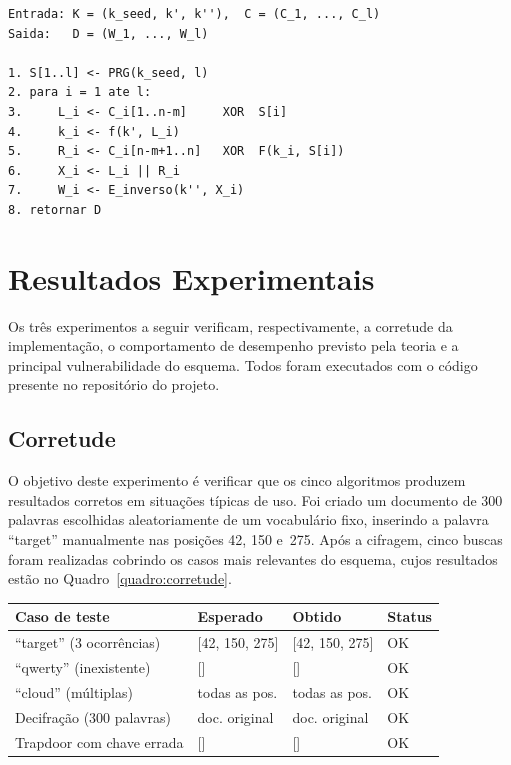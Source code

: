 \documentclass[
  12pt,
  oneside,
  a4paper,
  brazil
]{abntex2}
\begin{document}
\begin{lstlisting}[caption={Decrypt},label=alg:decrypt]
Entrada: K = (k_seed, k', k''),  C = (C_1, ..., C_l)
Saida:   D = (W_1, ..., W_l)

1. S[1..l] <- PRG(k_seed, l)
2. para i = 1 ate l:
3.     L_i <- C_i[1..n-m]     XOR  S[i]
4.     k_i <- f(k', L_i)
5.     R_i <- C_i[n-m+1..n]   XOR  F(k_i, S[i])
6.     X_i <- L_i || R_i
7.     W_i <- E_inverso(k'', X_i)
8. retornar D
\end{lstlisting}

\chapter{Resultados Experimentais}

Os três experimentos a seguir verificam, respectivamente, a corretude
da implementação, o comportamento de desempenho previsto pela teoria e
a principal vulnerabilidade do esquema. Todos foram executados com o
código presente no repositório do projeto.

\section{Corretude}

O objetivo deste experimento é verificar que os cinco algoritmos
produzem resultados corretos em situações típicas de uso. Foi criado
um documento de 300 palavras escolhidas aleatoriamente de um
vocabulário fixo, inserindo a palavra ``target'' manualmente nas
posições 42, 150 e~275. Após a cifragem, cinco buscas foram
realizadas cobrindo os casos mais relevantes do esquema, cujos
resultados estão no Quadro~\ref{quadro:corretude}.

\begin{quadro}[htb]
\caption{Resultados do experimento de corretude}
\label{quadro:corretude}
\begin{tabular}{p{5.2cm}p{3.2cm}p{3.2cm}p{1.5cm}}
\hline
\textbf{Caso de teste} & \textbf{Esperado} & \textbf{Obtido} & \textbf{Status} \\
\hline
``target'' (3 ocorrências) & {[42, 150, 275]} & {[42, 150, 275]} & OK \\
``qwerty'' (inexistente)   & {[]}             & {[]}             & OK \\
``cloud'' (múltiplas)      & todas as pos.    & todas as pos.    & OK \\
Decifração (300 palavras)  & doc. original    & doc. original    & OK \\
Trapdoor com chave errada  & {[]}             & {[]}             & OK \\
\hline
\end{tabular}
\end{quadro}
\end{document}
